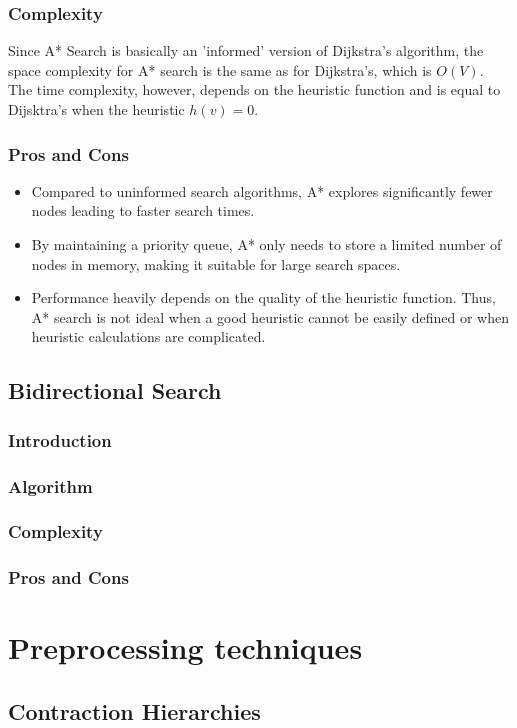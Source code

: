 		\subsubsection{Complexity}
		Since A* Search is basically an 'informed' version of Dijkstra's algorithm, the space complexity for A* search is the same as for Dijkstra's, which is $O(V)$.
		The time complexity, however, depends on the heuristic function and is equal to Dijsktra's when the heuristic $h(v) = 0$.
		\subsubsection{Pros and Cons}
			\begin{itemize}
				\item Compared to uninformed search algorithms, A* explores significantly fewer nodes leading to faster search times. 
				\item By maintaining a priority queue, A* only needs to store a limited number of nodes in memory, making it suitable for large search spaces.
				\item Performance heavily depends on the quality of the heuristic function. Thus, A* search is not ideal when a good heuristic cannot be easily defined or when heuristic calculations are complicated.
			\end{itemize}
	\subsection{Bidirectional Search}
		\subsubsection{Introduction}
		\subsubsection{Algorithm}
		\subsubsection{Complexity}
		\subsubsection{Pros and Cons}
\section{Preprocessing techniques}
\subsection{Contraction Hierarchies}

